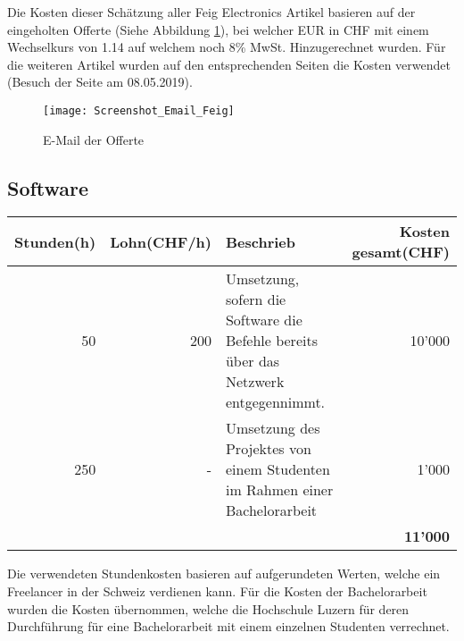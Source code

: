 Die Kosten dieser Schätzung aller Feig Electronics Artikel basieren auf der eingeholten Offerte (Siehe Abbildung \ref{fig:offerteFeig}), bei welcher EUR in CHF mit einem Wechselkurs von 1.14 auf welchem noch 8\% MwSt. Hinzugerechnet wurden.
Für die weiteren Artikel wurden auf den entsprechenden Seiten die Kosten verwendet (Besuch der Seite am 08.05.2019).

\begin{figure}[h!]
	\centering
	\texttt{[image: Screenshot\_Email\_Feig]}
	\caption{E-Mail der Offerte}
	\label{fig:offerteFeig}
\end{figure}

\subsection{Software}
\begin{tabularx}{\textwidth}{|r|r|X|r|}
	\hline
	\textbf{Stunden(h)} & \textbf{Lohn(CHF/h)} & \textbf{Beschrieb} & \textbf{Kosten gesamt(CHF)} \\
	\hline
	50 & 200 & Umsetzung, sofern die Software die Befehle bereits über das Netzwerk entgegennimmt. & 10'000 \\
	\hline
	250 & - & Umsetzung des Projektes von einem Studenten im Rahmen einer Bachelorarbeit & 1'000 \\
	& & & \textbf{11'000} \\
	\hline
\end{tabularx}

Die verwendeten Stundenkosten basieren auf aufgerundeten Werten, welche ein Freelancer in der Schweiz verdienen kann.
Für die Kosten der Bachelorarbeit wurden die Kosten übernommen, welche die Hochschule Luzern für deren Durchführung für eine Bachelorarbeit mit einem einzelnen Studenten verrechnet.
